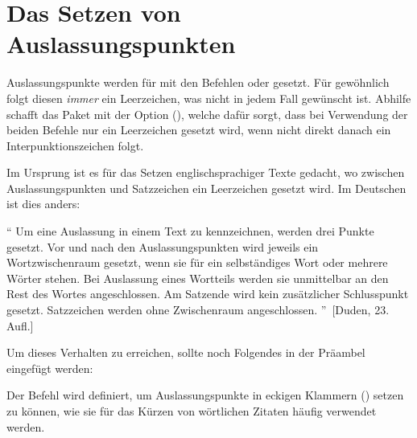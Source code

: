 \section{Das Setzen von Auslassungspunkten}
%
%
%
Auslassungspunkte werden für  mit den Befehlen  oder 
 gesetzt. Für gewöhnlich folgt diesen \emph{immer} ein 
Leerzeichen, was nicht in jedem Fall gewünscht ist. Abhilfe schafft das Paket 
 mit der Option (), welche 
dafür sorgt, dass bei Verwendung der beiden Befehle nur ein Leerzeichen gesetzt 
wird, wenn nicht direkt danach ein Interpunktionszeichen folgt.
%
\begin{quoting}
\begin{Code}
\usepackage[xspace]{ellipsis}
\end{Code}
\end{quoting}
%
Im Ursprung ist es für das Setzen englischsprachiger Texte gedacht, wo zwischen 
Auslassungspunkten und Satzzeichen ein Leerzeichen gesetzt wird. Im Deutschen 
ist dies anders:
%
\begin{quoting}
\enquote{%
  Um eine Auslassung in einem Text zu kennzeichnen, werden drei Punkte gesetzt. 
  Vor und nach den Auslassungspunkten wird jeweils ein Wortzwischenraum 
  gesetzt, wenn sie für ein selbständiges Wort oder mehrere Wörter stehen. Bei 
  Auslassung eines Wortteils werden sie unmittelbar an den Rest des Wortes 
  angeschlossen. Am Satzende wird kein zusätzlicher Schlusspunkt gesetzt. 
  Satzzeichen werden ohne Zwischenraum angeschlossen.%
}~[Duden, 23. Aufl.]
\end{quoting} 
%
Um dieses Verhalten zu erreichen, sollte noch Folgendes in der Präambel 
eingefügt werden:
%
\begin{quoting}
\begin{Code}
\let\ellipsispunctuation\relax
\newcommand*{\qdots}{[\dots{}]\xspace}
\end{Code}
\end{quoting}
%
Der Befehl  wird definiert, um Auslassungspunkte in eckigen 
Klammern (\POParameter{\dots}) setzen zu können, wie sie für das Kürzen von 
wörtlichen Zitaten häufig verwendet werden.




